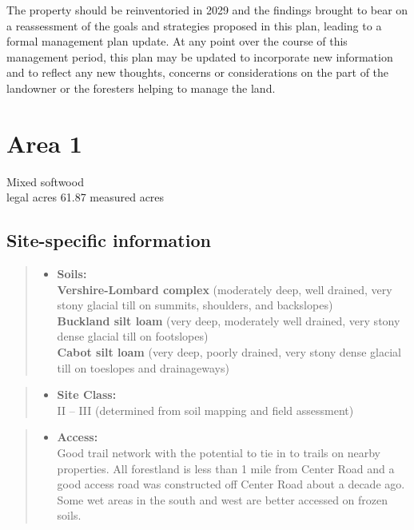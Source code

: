 \documentclass[]{tufte-handout}
\providecommand{\tightlist}{%
  \setlength{\itemsep}{0pt}\setlength{\parskip}{0pt}}
\begin{document}
The property should be reinventoried in 2029 and the findings brought to
bear on a reassessment of the goals and strategies proposed in this
plan, leading to a formal management plan update. At any point over the
course of this management period, this plan may be updated to
incorporate new information and to reflect any new thoughts, concerns or
considerations on the part of the landowner or the foresters helping to
manage the land.

\newpage

\section{Area 1}\label{area-1}

Mixed softwood\\
 legal acres \textbar{} 61.87 measured acres

\subsection{Site-specific information}\label{site-specific-information}

\begin{quote}
\begin{itemize}
\tightlist
\item
  \textbf{Soils:}\\
  \indent\indent  \textbf{Vershire-Lombard complex} (moderately deep,
  well drained, very stony glacial till on summits, shoulders, and
  backslopes)\\
  \textbf{Buckland silt loam} (very deep, moderately well drained, very
  stony dense glacial till on footslopes)\\
  \textbf{Cabot silt loam} (very deep, poorly drained, very stony dense
  glacial till on toeslopes and drainageways)
\end{itemize}
\end{quote}

\begin{quote}
\begin{itemize}
\tightlist
\item
  \textbf{Site Class:}\\
  \vspace{2pt} II -- III (determined from soil mapping and field
  assessment)
\end{itemize}
\end{quote}

\begin{quote}
\begin{itemize}
\tightlist
\item
  \textbf{Access:}\\
  \vspace{2pt} Good trail network with the potential to tie in to trails
  on nearby properties. All forestland is less than 1 mile from Center
  Road and a good access road was constructed off Center Road about a
  decade ago. Some wet areas in the south and west are better accessed
  on frozen soils.
\end{itemize}
\end{quote}
\end{document}
